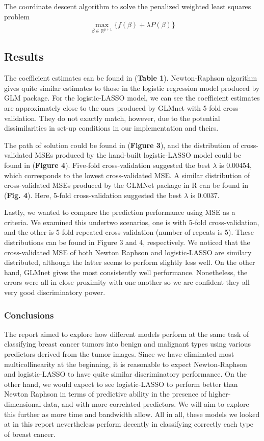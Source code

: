 \documentclass[]{article}
\begin{document}
The coordinate descent algorithm to solve the penalized weighted least
squares problem
\[\max_{\beta \in \mathbb{R}^{p+1}} \{ f(\beta) + \lambda P(\beta)\}\]

\hypertarget{results}{%
\subsection{Results}\label{results}}

The coefficient estimates can be found in (\textbf{Table 1}).
Newton-Raphson algorithm gives quite similar estimates to those in the
logistic regression model produced by GLM package. For the
logistic-LASSO model, we can see the coefficient estimates are
approximately close to the ones produced by GLMnet with 5-fold
cross-validation. They do not exactly match, however, due to the
potential dissimilarities in set-up conditions in our implementation and
theirs.

The path of solution could be found in (\textbf{Figure 3}), and the
distribution of cross-validated MSEs produced by the hand-built
logistic-LASSO model could be found in (\textbf{Figure 4}). Five-fold
cross-validation suggested the best \(\lambda\) is 0.00454, which
corresponds to the lowest cross-validated MSE. A similar distribution of
cross-validated MSEs produced by the GLMNet package in R can be found in
(\textbf{Fig. 4}). Here, 5-fold cross-validation suggested the best
\(\lambda\) is 0.0037.

Lastly, we wanted to compare the prediction performance using MSE as a
criteria. We examined this undertwo scenarios, one is with 5-fold
cross-validation, and the other is 5-fold repeated cross-validation
(number of repeats is 5). These distributions can be found in Figure 3
and 4, respectively. We noticed that the cross-validated MSE of both
Newton Raphson and logistic-LASSO are similary distributed, although the
latter seems to perform slightly less well. On the other hand, GLMnet
gives the most consistently well performance. Nonetheless, the errors
were all in close proximity with one another so we are confident they
all very good discriminatory power.

\hypertarget{conclusions}{%
\subsubsection{Conclusions}\label{conclusions}}

The report aimed to explore how different models perform at the same
task of classifying breast cancer tumors into benign and malignant types
using various predictors derived from the tumor images. Since we have
eliminated most multicollinearity at the beginning, it is reasonable to
expect Newton-Raphson and logistic-LASSO to have quite similar
discriminatory performance. On the other hand, we would expect to see
logistic-LASSO to perform better than Newton Raphson in terms of
predictive ability in the presence of higher-dimensional data, and with
more correlated predictors. We will aim to explore this further as more
time and bandwidth allow. All in all, these models we looked at in this
report nevertheless perform decently in classifying correctly each type
of breast cancer.
\end{document}
